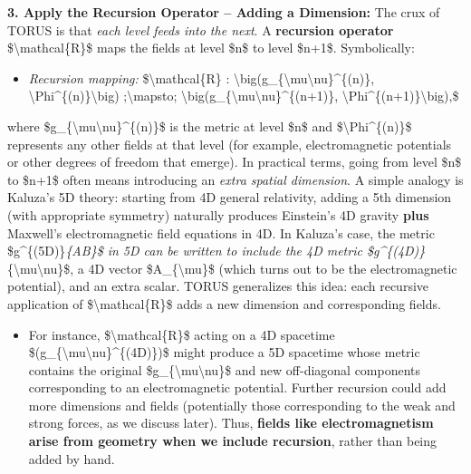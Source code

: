 \documentclass[]{article}
\begin{document}
\textbf{3. Apply the Recursion Operator -- Adding a Dimension:} The crux
of TORUS is that \emph{each level feeds into the next}. A
\textbf{recursion operator} \$\textbackslash{}mathcal\{R\}\$ maps the
fields at level \$n\$ to level \$n+1\$. Symbolically​:

\begin{itemize}
\item
  \emph{Recursion mapping:} \$\textbackslash{}mathcal\{R\} :
  \textbackslash{}big(g\_\{\textbackslash{}mu\textbackslash{}nu\}\^{}\{(n)\},
  \textbackslash{}Phi\^{}\{(n)\}\textbackslash{}big)
  ;\textbackslash{}mapsto;
  \textbackslash{}big(g\_\{\textbackslash{}mu\textbackslash{}nu\}\^{}\{(n+1)\},
  \textbackslash{}Phi\^{}\{(n+1)\}\textbackslash{}big),\$
\end{itemize}

where \$g\_\{\textbackslash{}mu\textbackslash{}nu\}\^{}\{(n)\}\$ is the
metric at level \$n\$ and \$\textbackslash{}Phi\^{}\{(n)\}\$ represents
any other fields at that level (for example, electromagnetic potentials
or other degrees of freedom that emerge). In practical terms, going from
level \$n\$ to \$n+1\$ often means introducing an \emph{extra spatial
dimension}. A simple analogy is Kaluza's 5D theory: starting from 4D
general relativity, adding a 5th dimension (with appropriate symmetry)
naturally produces Einstein's 4D gravity \textbf{plus} Maxwell's
electromagnetic field equations in 4D​. In Kaluza's case, the metric
\$g\^{}\{(5D)\}\emph{\{AB\}\$ in 5D can be written to include the 4D
metric \$g\^{}\{(4D)\}}\{\textbackslash{}mu\textbackslash{}nu\}\$, a 4D
vector \$A\_\{\textbackslash{}mu\}\$ (which turns out to be the
electromagnetic potential), and an extra scalar. TORUS generalizes this
idea: each recursive application of \$\textbackslash{}mathcal\{R\}\$
adds a new dimension and corresponding fields.

\begin{itemize}
\item
  For instance, \$\textbackslash{}mathcal\{R\}\$ acting on a 4D
  spacetime
  \$(g\_\{\textbackslash{}mu\textbackslash{}nu\}\^{}\{(4D)\})\$ might
  produce a 5D spacetime whose metric contains the original
  \$g\_\{\textbackslash{}mu\textbackslash{}nu\}\$ and new off-diagonal
  components corresponding to an electromagnetic potential. Further
  recursion could add more dimensions and fields (potentially those
  corresponding to the weak and strong forces, as we discuss later).
  Thus, \textbf{fields like electromagnetism arise from geometry when we
  include recursion}, rather than being added by hand.
\end{itemize}
\end{document}
